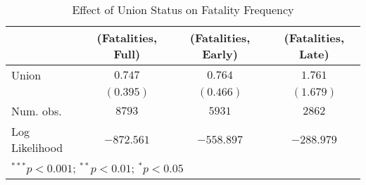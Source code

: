 
\begin{table}[H]
\begin{center}
\begin{tabular}{l c c c}
\hline
 & (Fatalities, Full) & (Fatalities, Early) & (Fatalities, Late) \\
\hline
Union          & $0.747$    & $0.764$    & $1.761$    \\
               & $(0.395)$  & $(0.466)$  & $(1.679)$  \\
\hline
Num. obs.      & $8793$     & $5931$     & $2862$     \\
Log Likelihood & $-872.561$ & $-558.897$ & $-288.979$ \\
\hline
\multicolumn{4}{l}{\scriptsize{$^{***}p<0.001$; $^{**}p<0.01$; $^{*}p<0.05$}}
\end{tabular}
\caption{Effect of Union Status on Fatality Frequency}
\label{irr_fte_fatalities_table}
\end{center}
\end{table}


